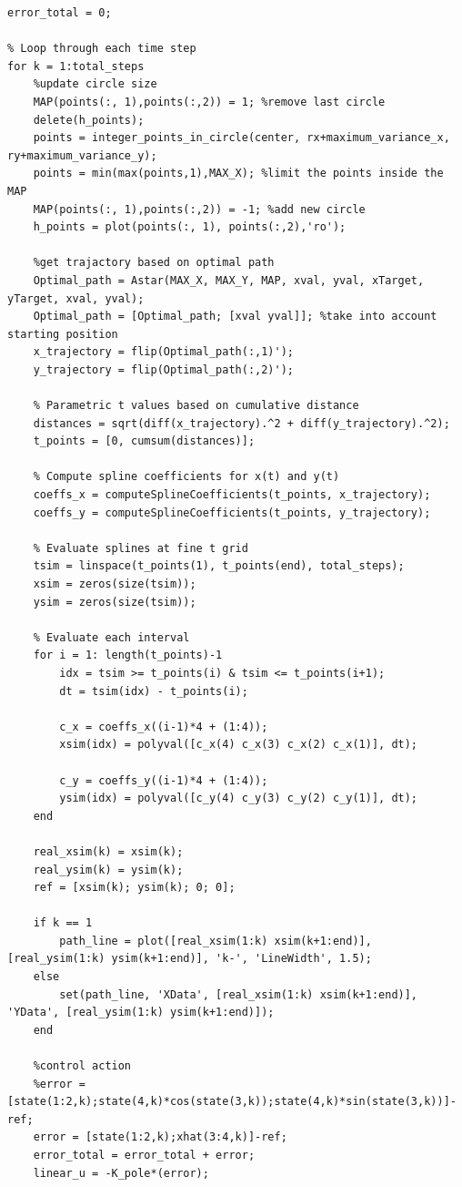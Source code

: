\documentclass[12pt]{article}
\begin{document}
\begin{lstlisting}
error_total = 0;

% Loop through each time step
for k = 1:total_steps
    %update circle size
    MAP(points(:, 1),points(:,2)) = 1; %remove last circle
    delete(h_points);
    points = integer_points_in_circle(center, rx+maximum_variance_x, ry+maximum_variance_y);
    points = min(max(points,1),MAX_X); %limit the points inside the MAP
    MAP(points(:, 1),points(:,2)) = -1; %add new circle
    h_points = plot(points(:, 1), points(:,2),'ro');
    
    %get trajactory based on optimal path
    Optimal_path = Astar(MAX_X, MAX_Y, MAP, xval, yval, xTarget, yTarget, xval, yval);
    Optimal_path = [Optimal_path; [xval yval]]; %take into account starting position
    x_trajectory = flip(Optimal_path(:,1)');
    y_trajectory = flip(Optimal_path(:,2)');
    
    % Parametric t values based on cumulative distance
    distances = sqrt(diff(x_trajectory).^2 + diff(y_trajectory).^2);
    t_points = [0, cumsum(distances)];
    
    % Compute spline coefficients for x(t) and y(t)
    coeffs_x = computeSplineCoefficients(t_points, x_trajectory);
    coeffs_y = computeSplineCoefficients(t_points, y_trajectory);
    
    % Evaluate splines at fine t grid
    tsim = linspace(t_points(1), t_points(end), total_steps);
    xsim = zeros(size(tsim));
    ysim = zeros(size(tsim));
    
    % Evaluate each interval
    for i = 1: length(t_points)-1
        idx = tsim >= t_points(i) & tsim <= t_points(i+1);
        dt = tsim(idx) - t_points(i);
    
        c_x = coeffs_x((i-1)*4 + (1:4));
        xsim(idx) = polyval([c_x(4) c_x(3) c_x(2) c_x(1)], dt);
    
        c_y = coeffs_y((i-1)*4 + (1:4));
        ysim(idx) = polyval([c_y(4) c_y(3) c_y(2) c_y(1)], dt);
    end

    real_xsim(k) = xsim(k);
    real_ysim(k) = ysim(k);
    ref = [xsim(k); ysim(k); 0; 0];
    
    if k == 1
        path_line = plot([real_xsim(1:k) xsim(k+1:end)], [real_ysim(1:k) ysim(k+1:end)], 'k-', 'LineWidth', 1.5);
    else
        set(path_line, 'XData', [real_xsim(1:k) xsim(k+1:end)], 'YData', [real_ysim(1:k) ysim(k+1:end)]);
    end 

    %control action 
    %error = [state(1:2,k);state(4,k)*cos(state(3,k));state(4,k)*sin(state(3,k))]-ref;
    error = [state(1:2,k);xhat(3:4,k)]-ref;
    error_total = error_total + error;
    linear_u = -K_pole*(error);


\end{lstlisting}
\end{document}
